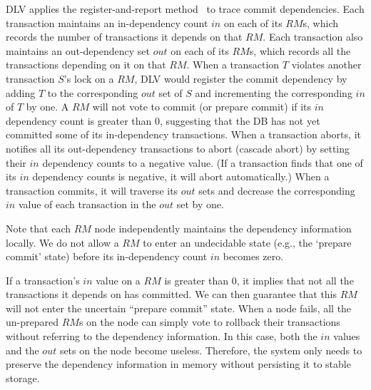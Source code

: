 \documentclass[conference]{IEEEtran}
\begin{document}
DLV applies the register-and-report method~\cite{HeckatonMVCC:journals/pvldb/LarsonBDFPZ11} to trace commit dependencies.
Each transaction maintains an in-dependency count ${in}$ on each of its ${RM}$s, which records the number of transactions it depends on that ${RM}$.
Each transaction also maintains an out-dependency set  ${out}$ on each of its ${RM}$s, which records all the transactions depending on it on that ${RM}$.
When a transaction ${T}$ violates another transaction ${S}$'s lock on a ${RM}$,
DLV would register the commit dependency by adding ${T}$ to the corresponding ${out}$ set of ${S}$ and incrementing the corresponding ${in}$ of ${T}$ by one.
A ${RM}$ will not vote to commit (or prepare commit) if its ${in}$ dependency count is greater than 0, suggesting that the DB has not yet committed some of its in-dependency transactions.
When a transaction aborts, it notifies all its out-dependency transactions to abort (cascade abort) by setting their ${in}$ dependency counts to a negative value.
(If a transaction finds that one of its ${in}$ dependency counts is negative, it will abort automatically.)
When a transaction commits, it will traverse its ${out}$ sets and decrease the corresponding ${in}$ value of each transaction in the ${out}$ set by one.
\begin{highlighted}

Note that each $RM$ node independently maintains the dependency information locally.
We do not allow a ${RM}$ to enter an undecidable state (e.g., the `prepare commit' state) before its in-dependency count ${in}$ becomes zero.

If a transaction's ${in}$ value on a ${RM}$ is greater than 0, it implies that not all the transactions it depends on has committed.
We can then guarantee that this ${RM}$ will not enter the uncertain ``prepare commit'' state.
When a node fails, all the un-prepared ${RM}$s on the node can simply vote to rollback their transactions without referring to the dependency information.
In this case, both the ${in}$ values and the ${out}$ sets on the node become useless.
Therefore, the system only needs to preserve the dependency information in memory without persisting it to stable storage.

\end{highlighted}
\end{document}

